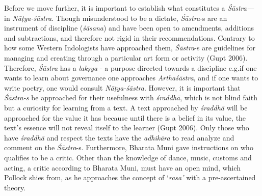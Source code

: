 Before we move further, it is important to establish what constitutes a \textsl{Śāstra---} in \textsl{Nāṭya-śāstra}. Though misunderstood to be a dictate, \hbox{\textsl{Śāstra}-s} are an instrument of discipline (\textsl{śāsana}) and have been open to amendments, additions and subtractions, and therefore not rigid in their recommendations. Contrary to how some Western Indologists have approached them, \textsl{Śāstra}-s are guidelines for managing and creating through a particular art form or activity (Gupt 2006). Therefore, \textsl{Śāstra} has a \textsl{lakṣya} - a purpose directed towards a discipline e.g.\@ if one wants to learn about governance one approaches \textsl{Arthaśāstra}, and if one wants to write poetry, one would consult \textsl{Nāṭya-śāstra}. However, it is important that \textsl{Śāstra-s} be approached for their usefulness with \textsl{śraddhā}, which is not blind faith but a curiosity for learning from a text. A text approached by \textsl{śraddhā} will be approached for the value it has because until there is a belief in its value, the text’s essence will not reveal itself to the learner (Gupt 2006).  Only those who have \textsl{śraddhā} and respect the texts have the \textsl{adhikāra} to read analyze and comment on the \hbox{\textsl{Śāstra}-s}. Furthermore, Bharata Muni gave instructions on who qualifies to be a critic. Other than the knowledge of dance, music, customs and acting, a critic according to Bharata Muni, must have an open mind, which Pollock shies from, as he approaches the concept of ‘\textsl{rasa’} with a pre-ascertained theory.

\newpage

